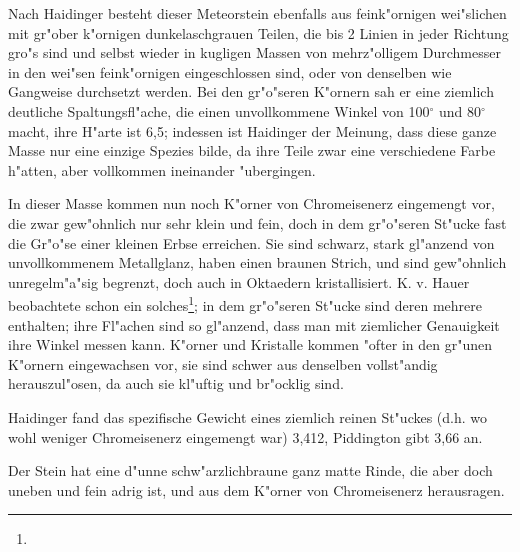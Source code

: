 \documentclass[a4paper, 11pt, oneside]{article}
\begin{document}
Nach Haidinger besteht dieser Meteorstein ebenfalls aus feink"ornigen wei"slichen mit gr"ober k"ornigen dunkelaschgrauen Teilen, die bis 2 Linien in jeder Richtung gro"s sind und selbst wieder in kugligen Massen von mehrz"olligem Durchmesser in den wei"sen feink"ornigen eingeschlossen sind, oder von denselben wie Gangweise durchsetzt werden. Bei den gr"o"seren K"ornern sah er eine ziemlich deutliche Spaltungsfl"ache, die einen unvollkommene Winkel von 100$^{\circ}$ und 80$^{\circ}$ macht, ihre H"arte ist 6,5; indessen ist Haidinger der Meinung, dass diese ganze Masse nur eine einzige Spezies bilde, da ihre Teile zwar eine verschiedene Farbe h"atten, aber vollkommen ineinander "ubergingen.

In dieser Masse kommen nun noch K"orner von Chromeisenerz eingemengt vor, die zwar gew"ohnlich nur sehr klein und fein, doch in dem gr"o"seren St"ucke fast die Gr"o"se einer kleinen Erbse erreichen. Sie sind schwarz, stark gl"anzend von unvollkommenem Metallglanz, haben einen braunen Strich, und sind gew"ohnlich unregelm"a"sig begrenzt, doch auch in Oktaedern kristallisiert. K. v. Hauer beobachtete schon ein solches\footnote{}; in dem gr"o"seren St"ucke sind deren mehrere enthalten; ihre Fl"achen sind so gl"anzend, dass man mit ziemlicher Genauigkeit ihre Winkel messen kann. K"orner und Kristalle kommen "ofter in den gr"unen K"ornern eingewachsen vor, sie sind schwer aus denselben vollst"andig herauszul"osen, da auch sie kl"uftig und br"ocklig sind.

Haidinger fand das spezifische Gewicht eines ziemlich reinen St"uckes (d.h. wo wohl weniger Chromeisenerz eingemengt war) 3,412, Piddington gibt 3,66 an.

Der Stein hat eine d"unne schw"arzlichbraune ganz matte Rinde, die aber doch uneben und fein adrig ist, und aus dem K"orner von Chromeisenerz herausragen.
\end{document}
